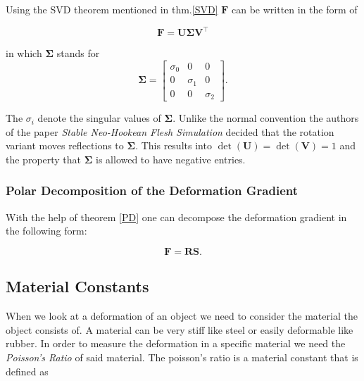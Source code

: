 Using the SVD theorem mentioned in thm.\ref{SVD} $\mathbf{F}$ can be written in the form of

\begin{equation}\label{eq:svd_gradient}
\mathbf{F} = \mathbf{U \Sigma V^\intercal}
\end{equation}

in which $\mathbf{\Sigma}$ stands for
\begin{equation}\label{eq:svd_simga}
\mathbf{\Sigma} = \left[\begin{matrix}  \sigma_0 & 0 & 0 \\ 0 & \sigma_1 & 0 \\ 0 & 0 & \sigma_2 \end{matrix}\right] .
\end{equation}

The $\sigma_i$ denote the singular values of $\mathbf{\Sigma}$. Unlike the normal convention the authors of the paper \textit{Stable Neo-Hookean Flesh Simulation} decided that the rotation variant moves reflections to $\mathbf{\Sigma}$. This results into $\operatorname{det}(\mathbf{U})=\operatorname{det}(\mathbf{V})=1$ and the property that $\mathbf{\Sigma}$ is allowed to have negative entries.




\subsubsection{Polar Decomposition of the Deformation Gradient}
With the help of theorem \ref{PD} one can decompose the deformation gradient in the following form:

\[
\mathbf{F} = \mathbf{RS}.
\]



\subsection{Material Constants}
When we look at a deformation of an object we need to consider the material the object consists of. A material can be very stiff like steel or easily deformable like rubber. In order to measure the deformation in a specific material we need the \textit{Poisson's Ratio} of said material. The poisson's ratio is a material constant that is defined as 

